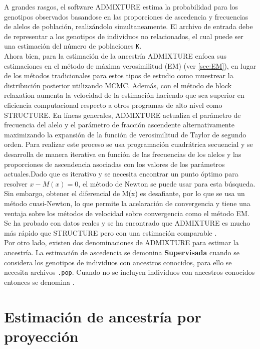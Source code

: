 A grandes rasgos, el software ADMIXTURE estima la probabilidad para los genotipos observados basandose en las proporciones de ascedencia y frecuencias de alelos de poblaci\'on, realiz\'andolo simultaneamente. El archivo de entrada debe de representar a los genotipos de individuos no relacionados, el cual puede ser una estimaci\'on del número de poblaciones \texttt{K}.\\ 

Ahora bien, para la estimaci\'on de la ancestr\'ia ADMIXTURE enfoca sus estimaciones en el m\'etodo de m\'axima verosimilitud (EM) (ver \ref{sec:EM}), en lugar de los m\'etodos tradicionales para estos tipos de estudio como muestrear la distribuci\'on posterior utilizando MCMC. Adem\'as, con el m\'etodo de block relaxation aumenta la velocidad de la estimaci\'on haciendo que sea superior en eficiencia computacional respecto a otros programas de alto nivel como STRUCTURE. En l\'ineas generales, ADMIXTURE actualiza el par\'ametro de frecuencia del alelo y el par\'ametro de fracci\'on ascendente alternativamente maximizando la expansi\'on de la funci\'on de verosimilitud de Taylor de segundo orden. Para realizar este proceso se usa programaci\'on cuadr\'atrica secuencial y se desarrolla de manera iterativa en funci\'on de las frecuencias de los alelos y las proporciones de ascendencia asociadas con los valores de los par\'ametros actuales.Dado que es iterativo y se necesita encontrar un punto \'optimo para resolver $x-M(x) = 0$, el m\'etodo de Newton se puede usar para esta b\'usqueda. Sin embargo, obtener el diferencial de M(x) es desafiante, por lo que se usa un m\'etodo cuasi-Newton, lo que permite la acelaraci\'on de convergencia y tiene una ventaja sobre los m\'etodos de velocidad sobre convergencia como el m\'etodo EM. Se ha probado con datos reales y se ha encontrado que ADMIXTURE es mucho m\'as r\'apido que STRUCTURE pero con una estimaci\'on comparable \cite{Yushi}. \\

Por otro lado, existen dos denominaciones de ADMIXTURE para estimar la ancestr\'ia. La estimaci\'on de ascedencia se demonina \textbf{Supervisada} cuando se considera los genotipos de individuos con ancestros conocidos, para ello se necesita archivos \texttt{.pop}. Cuando no se incluyen individuos con ancestros conocidos entonces se denomina  \cite{Timothy}.\\


\section{Estimaci\'on de ancestr\'ia por proyecci\'on}

